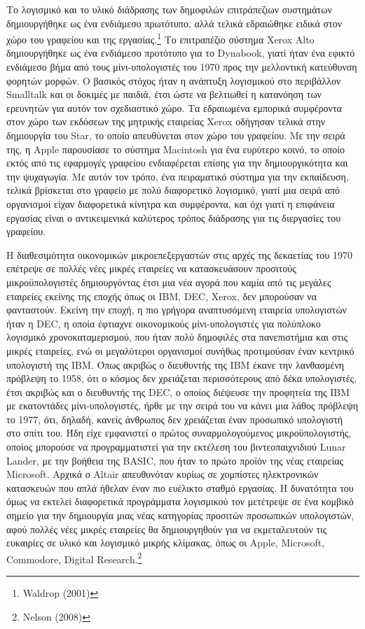 \documentclass[
]{article}
\begin{document}
Το λογισμικό και το υλικό διάδρασης των δημοφιλών επιτράπεζιων
συστημάτων δημιουργήθηκε ως ένα ενδιάμεσο πρωτότυπο, αλλά τελικά
εδραιώθηκε ειδικά στον χώρο του γραφείου και της εργασίας.\footnote{Waldrop
  (2001)} Το επιτραπέζιο σύστημα Xerox Alto δημιουργήθηκε ως ένα
ενδιάμεσο προτότυπο για το Dynabook, γιατί ήταν ένα εφικτό ενδιάμεσο
βήμα από τους μίνι-υπολογιστές του 1970 προς την μελλοντική κατεύθυνση
φορητών μορφών. Ο βασικός στόχος ήταν η ανάπτυξη λογισμικού στο
περιβάλλον Smalltalk και οι δοκιμές με παιδιά, έτσι ώστε να βελτιωθεί η
κατανόηση των ερευνητών για αυτόν τον σχεδιαστικό χώρο. Τα εδραιωμένα
εμπορικά συμφέροντα στον χώρο των εκδόσεων της μητρικής εταιρείας Xerox
οδήγησαν τελικά στην δημιουργία του Star, το οποίο απευθύνεται στον χώρο
του γραφείου. Με την σειρά της, η Apple παρουσίασε το σύστημα Macintosh
για ένα ευρύτερο κοινό, το οποίο εκτός από τις εφαρμογές γραφείου
ενδιαφέρεται επίσης για την δημιουργικότητα και την ψυχαγωγία. Με αυτόν
τον τρόπο, ένα πειραματικό σύστημα για την εκπαίδευση, τελικά βρίσκεται
στο γραφείο με πολύ διαφορετικό λογισμικό, γιατί μια σειρά από
οργανισμοί είχαν διαφορετικά κίνητρα και συμφέροντα, και όχι γιατί η
επιφάνεια εργασίας είναι ο αντικειμενικά καλύτερος τρόπος διάδρασης για
τις διεργασίες του γραφείου.

Η διαθεσιμότητα οικονομικών μικροεπεξεργαστών στις αρχές της δεκαετίας
του 1970 επέτρεψε σε πολλές νέες μικρές εταιρείες να κατασκευάσουν
προσιτούς μικροϋπολογιστές δημιουργόντας έτσι μια νέα αγορά που καμία
από τις μεγάλες εταιρείες εκείνης της εποχής όπως οι IBM, DEC, Xerox,
δεν μπορούσαν να φανταστούν. Εκείνη την εποχή, η πιο γρήγορα
αναπτυσόμενη εταιρεία υπολογιστών ήταν η DEC, η οποία έφτιαχνε
οικονομικούς μίνι-υπολογιστές για πολύπλοκο λογισμικό χρονοκαταμερισμού,
που ήταν πολύ δημοφιλές στα πανεπιστήμια και στις μικρές εταιρείες, ενώ
οι μεγαλύτεροι οργανισμοί συνήθως προτιμούσαν έναν κεντρικό υπολογιστή
της IBM. Όπως ακριβώς ο διευθυντής της IBM έκανε την λανθασμένη πρόβλεψη
το 1958, ότι ο κόσμος δεν χρειάζεται περισσότερους από δέκα υπολογιστές,
έτσι ακριβώς και ο διευθυντής της DEC, ο οποίος διέψευσε την προφητεία
της IBM με εκατοντάδες μίνι-υπολογιστές, ήρθε με την σειρά του να κάνει
μια λάθος πρόβλεψη το 1977, ότι, δηλαδή, κανείς άνθρωπος δεν χρειάζεται
έναν προσωπικό υπολογιστή στο σπίτι του. Ήδη είχε εμφανιστεί ο πρώτος
συναρμολογούμενος μικροϋπολογιστής, οποίος μπορούσε να προγραμματιστεί
για την εκτέλεση του βιντεοπαιχνιδιού Lunar Lander, με την βοήθεια της
BASIC, που ήταν το πρώτο προϊόν της νέας εταιρείας Microsoft. Αρχικά ο
Altair απευθυνόταν κυρίως σε χομπίστες ηλεκτρονικών κατασκευών που απλά
ήθελαν έναν πιο ευέλικτο σταθμό εργασίας. Η δυνατότητα του όμως να
εκτελεί διαφορετικά προγράμματα λογισμικού τον μετέτρεψε σε ένα κομβικό
σημείο για την δημιουργία μιας νέας κατηγορίας προσιτών προσωπικών
υπολογιστών, αφού πολλές νέες μικρές εταιρείες θα δημιουργηθούν για να
εκμεταλευτούν τις ευκαιρίες σε υλικό και λογισμικό μικρής κλίμακας, όπως
οι Apple, Microsoft, Commodore, Digital Research.\footnote{Nelson (2008)}
\end{document}
